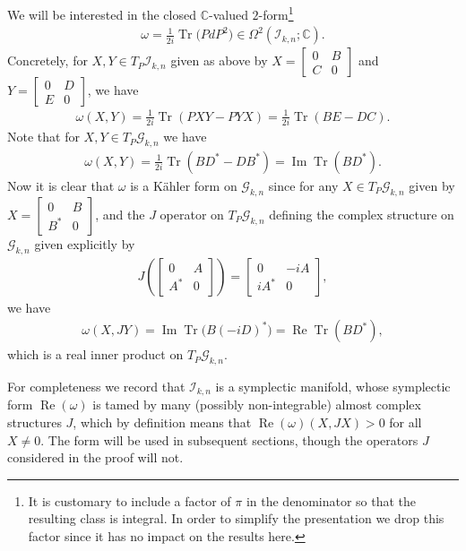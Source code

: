 \documentclass[pdftex]{sigma}
\DeclareMathOperator{\Tr}{Tr}
\numberwithin{equation}{section}
\newcommand{\CC}{\mathbb{C}}
\newcommand{\cG}{{\mathcal G}}
\newcommand{\cI}{{\mathcal I}}
\newcommand{\Om}{\Omega}
\begin{document}
We will be interested in the closed $\CC$-valued $2$-form\footnote{It is customary to include a factor of $\pi$ in the denominator so that the resulting class is integral. In order to simplify the presentation we drop this factor since it has no impact on the results here.}
\begin{gather*}
\omega = \frac {1}{2i} \Tr\big(P dP^2\big) \in \Om^2 ( \cI_{k,n} ; \CC).
\end{gather*}
Concretely, for $X,Y \in T_P \cI_{k,n}$ given as above by
$X =\left[
\begin{smallmatrix}
0 & B \\
C & 0
\end{smallmatrix}\right]$ and
$Y =\left[
\begin{smallmatrix}
0 & D \\
E & 0
\end{smallmatrix}\right]$, we have
\begin{gather*}
\omega(X,Y) = \frac {1}{2i} \Tr(PXY - PYX) = \frac {1}{2i} \Tr (BE - DC) .
\end{gather*}
Note that for $X,Y \in T_P \cG_{k,n}$ we have
\begin{gather*}
\omega(X,Y) = \frac {1}{2i} \Tr(BD^* - DB^*) = \operatorname{Im} \Tr(BD^*).
\end{gather*}
Now it is clear that $\omega$ is a K\"ahler form on $ \cG_{k,n}$ since for any $X \in T_P \cG_{k,n}$ given by
$X =\left[
\begin{smallmatrix}
0 & B \\
B^* & 0
\end{smallmatrix}\right]$, and the $J$ operator on $T_P \cG_{k,n}$ defining the complex structure on $\cG_{k,n}$ given explicitly by
\begin{gather*}
J\left(
\begin{bmatrix}
0 & A \\
A^* & 0
\end{bmatrix}
\right)
=
\begin{bmatrix}
0 & -iA \\
iA^* & 0
\end{bmatrix},
\end{gather*}
we have
\begin{gather*}
\omega(X,JY) = \operatorname{Im} \Tr \big(B (-iD)^*\big) = \operatorname{Re} \Tr(B D^*),
\end{gather*}
which is a real inner product on $T_P \cG_{k,n}$.

For completeness we record that $\cI_{k,n}$ is a symplectic manifold, whose symplectic form $\operatorname{Re}(\omega)$ is tamed by many (possibly non-integrable) almost complex structures $J$, which by definition means that $\operatorname{Re}(\omega)(X,JX) >0$ for all $X\neq 0$. The form will be used in subsequent sections, though the operators $J$ considered in the proof will not.
\end{document}
